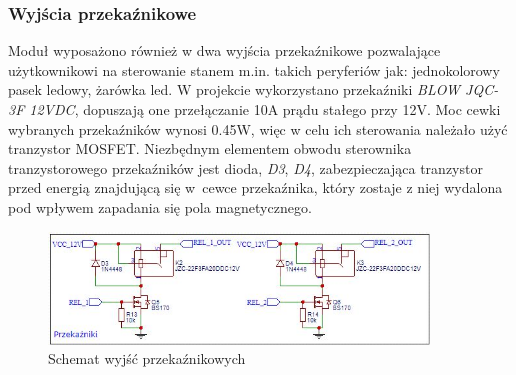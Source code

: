 \documentclass[12pt, eng, twoside, openany, final]{mgr}
\begin{document}
            \subsubsection{Wyjścia przekaźnikowe}
            Moduł wyposażono również w dwa wyjścia przekaźnikowe pozwalające użytkownikowi na sterowanie stanem m.in. takich peryferiów jak: jednokolorowy pasek ledowy, żarówka led. W projekcie wykorzystano przekaźniki \emph{BLOW JQC-3F 12VDC}, dopuszają one przełączanie 10A prądu stałego przy 12V\cite{relData}.
            Moc cewki wybranych przekaźników wynosi 0.45W, więc w celu ich sterowania należało użyć tranzystor MOSFET. Niezbędnym elementem obwodu sterownika tranzystorowego przekaźników jest dioda, \emph{D3}, \emph{D4}, zabezpieczająca tranzystor przed energią znajdującą się w~cewce przekaźnika, który zostaje z niej wydalona pod wpływem zapadania się pola magnetycznego.
                \begin{figure}[H]
                \begin{center}
                    \includegraphics[width=0.9\textwidth]{przekazniki1.jpg}
                    \caption{Schemat wyjść przekaźnikowych}
                \end{center}
                \end{figure}
\end{document}
